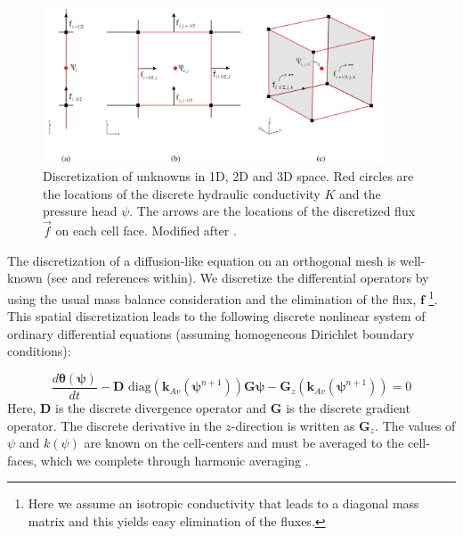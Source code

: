 \documentclass[preprint,review,3p,times,onecolumn,authoryear]{elsarticle}
\newcommand{\bfD}{\mathbf{D}}
\newcommand{\bff}{\mathbf{f}}
\begin{document}
\begin{figure}[!htbp]
\begin{center}
\includegraphics[width=0.9\textwidth]{finite-volume.png}
\end{center}
\caption{Discretization of unknowns in 1D, 2D and 3D space. Red circles are the locations of the discrete hydraulic conductivity $K$ and the pressure head $\psi$.
The arrows are the locations of the discretized flux $\vec f$ on each cell face. Modified after \cite{fvtutorial}.}
\label{fig:richards-finite-volume}
\end{figure}


The discretization of a diffusion-like equation on an orthogonal mesh is well-known (see \cite{Haber2001,fletcher,HaberHeldmannAscher07,Ascher2011} and references within). We discretize the differential operators by using the usual mass balance consideration and the elimination of the flux, $\bff$ \footnote{Here we assume an isotropic conductivity that leads to a diagonal mass matrix and this yields easy elimination of the fluxes.}. This spatial discretization leads to the following discrete nonlinear system of ordinary differential equations (assuming homogeneous Dirichlet boundary conditions):


\begin{equation}
\label{eq:richards-mixed:discrete}
\frac{d \boldsymbol{\theta}(\boldsymbol{\psi})}{d t}
- \mathbf{D}
    \text{ diag}
    \left(
        \mathbf{k}_{Av}(\boldsymbol{\psi}^{n+1})
    \right)
\mathbf{G} \boldsymbol{\psi}
- \mathbf{G}_z
    \left(
        \mathbf{k}_{Av}(\boldsymbol{\psi}^{n+1})
    \right)
=0
\end{equation}
Here, $\bfD$ is the discrete divergence operator and $\mathbf{G}$ is the discrete gradient operator. The discrete derivative in the $z$-direction is written as $\mathbf{G}_z$. The values of $\psi$ and $k(\psi)$ are known on the cell-centers and must be averaged to the cell-faces, which we complete through harmonic averaging \citep{Haber2001}.
\end{document}
